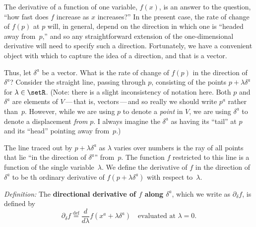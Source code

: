 \documentclass[10pt, a4paper]{article}
\newcommand{\isdef}{\mathrel{\stackrel{\text{def}}{=}}}
\begin{document}

The derivative of a function of one variable, $f(x)$, is an answer to
the question, ``how fast does $f$ increase as $x$ increases?'' In the
present case, the rate of change of $f(p)$ at $p$ will, in general,
depend on the direction in which one is “headed away from~$p$,” and so
any straightforward extension of the one-dimensional derivative will
need to specify such a direction. Fortunately, we have a convenient
object with which to capture the idea of a direction, and that is a
vector.

Thus, let $\delta^a$ be a vector. What is the rate of change of $f(p)$ in
the direction of~$\delta^a$? Consider the straight line, passing through
$p$, consisting of the points $p+\lambda\delta^a$ for
$\lambda\in\setR$. (Note: there is a slight inconsistency of notation
here. Both $p$ and $\delta^a$ are elements of $V$\,---\,that is,
vectors\,---\,and so really we should write $p^a$ rather
than~$p$. However, while we are using $p$ to denote a \emph{point} in
$V$, we are using $\delta^a$ to denote a displacement \emph{from} $p$. I
always imagine the $\delta^a$ as having its ``tail'' at $p$ and its
``head'' pointing away from~$p$.)

The line traced out by $p+\lambda\delta^a$ as $\lambda$ varies over numbers is the ray
of all points that lie ``in the direction of $\delta^a$'' from~$p$. The
function $f$ restricted to this line is a function of the single
variable~$\lambda$. We define the derivative of $f$ in the direction
of $\delta^a$ to be th ordinary derivative of $f(p+\lambda\delta^a)$ with respect
to~$\lambda$.

\emph{Definition:} The \textbf{directional derivative of $f$ along
  $\delta^a$}, which we write as $\partial_\delta f$, is defined by
\begin{equation}
\partial_\delta f \isdef \frac{d}{d\lambda} f(x^a+\lambda\delta^a) \quad\text{evaluated at $\lambda = 0$}.
  \label{eq:directional-derivative}
\end{equation}
\end{document}
